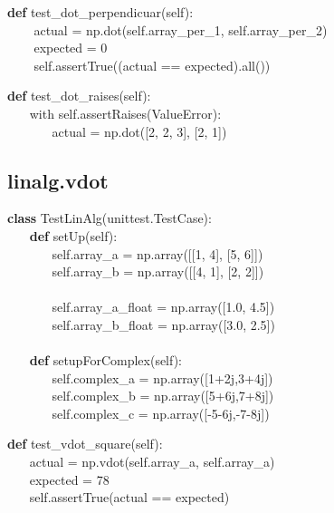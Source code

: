 \documentclass[a4paper,11pt]{article}
\begin{document}
\begin{algorithm}[H]
	
	\textbf{def} test\_dot\_perpendicuar(self):
	\\ $ ~~~~~~~~ $	actual = np.dot(self.array\_per\_1, self.array\_per\_2)
	\\ $ ~~~~~~~~ $	expected = 0
	\\ $ ~~~~~~~~ $	self.assertTrue((actual == expected).all())
\end{algorithm}


\begin{algorithm}[H]
    \textbf{def} test\_dot\_raises(self):
\\ $ ~~~~~~~~ $with self.assertRaises(ValueError):
\\ $ ~ ~~~~~~~~ ~~~~~~~ $actual = np.dot([2, 2, 3], [2, 1])
\end{algorithm}

\subsection{linalg.vdot}
\begin{algorithm}[H]
\textbf{class} TestLinAlg(unittest.TestCase):
\\ $ ~~~~~~~~ $\textbf{def} setUp(self):
\\ $ ~~~~~~~~~~~~~~~~ $self.array\_a = np.array([[1, 4], [5, 6]])
\\ $ ~~~~~~~~~~~~~~~~ $self.array\_b = np.array([[4, 1], [2, 2]])
\\
\\ $ ~~~~~~~~~~~~~~~~ $self.array\_a\_float = np.array([1.0, 4.5])
\\ $ ~~~~~~~~~~~~~~~~ $self.array\_b\_float = np.array([3.0, 2.5])
\\
\\ $ ~~~~~~~~ $\textbf{def} setupForComplex(self):
\\ $ ~~~~~~~~~~~~~~~~ $self.complex\_a = np.array([1+2j,3+4j])   
\\ $ ~~~~~~~~~~~~~~~~ $self.complex\_b = np.array([5+6j,7+8j])
\\ $ ~~~~~~~~~~~~~~~~ $self.complex\_c = np.array([-5-6j,-7-8j])
\end{algorithm}


\begin{algorithm}[H]
	\textbf{def} test\_vdot\_square(self):
	\\ $ ~~~~~~~~ $actual = np.vdot(self.array\_a, self.array\_a)
	\\ $ ~~~~~~~~ $expected = 78
	\\ $ ~~~~~~~~ $self.assertTrue(actual == expected)
\end{algorithm}
\end{document}
